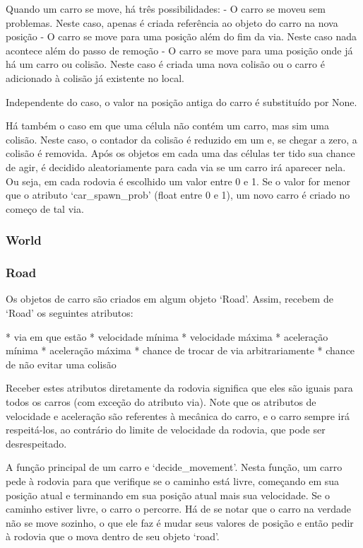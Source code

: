\documentclass{article}
\begin{document}
    Quando um carro se move, há três possibilidades:
    - O carro se moveu sem problemas. Neste caso, apenas é criada referência ao objeto do carro na nova posição
    - O carro se move para uma posição além do fim da via. Neste caso nada acontece além do passo de remoção
    - O carro se move para uma posição onde já há um carro ou colisão. Neste caso é  criada uma nova colisão ou o
    carro é adicionado à colisão já existente no local.
    
    Independente do caso, o valor na posição antiga do carro é substituído por None.
    
    Há também o caso em que uma célula não contém um carro, mas sim uma colisão. Neste caso, o contador da colisão
    é reduzido em um e, se chegar a zero, a colisão é removida.
    Após os objetos em cada uma das células ter tido sua chance de agir, é decidido aleatoriamente para cada via se
    um carro irá aparecer nela. Ou seja, em cada rodovia é escolhido um valor entre 0 e 1. Se o valor for menor
    que o atributo `car\_spawn\_prob' (float entre 0 e 1), um novo carro é criado no começo de tal via.
    

    \subsubsection{World}

    \subsubsection{Road}
    Os objetos de carro são criados em algum objeto `Road'. Assim, recebem de `Road' os seguintes atributos:

    * via em que estão
    * velocidade mínima
    * velocidade máxima
    * aceleração mínima
    * aceleração máxima
    * chance de trocar de via arbitrariamente
    * chance de não evitar uma colisão

    Receber estes atributos diretamente da rodovia significa que eles são iguais para todos os carros (com
    exceção do atributo via). Note que os atributos de velocidade e aceleração são referentes à mecânica do
    carro, e o carro sempre irá respeitá-los, ao contrário do limite de velocidade da rodovia, que pode ser
    desrespeitado.

    A função principal de um carro e `decide\_movement'. Nesta função, um carro pede à rodovia para que verifique
    se o caminho está livre, começando em sua posição atual e terminando em sua posição atual mais sua velocidade.
    Se o caminho estiver livre, o carro o percorre. Há de se notar que o carro na verdade não se move sozinho, o que
    ele faz é mudar seus valores de posição e então pedir à rodovia que o mova dentro de seu objeto `road'.
\end{document}

